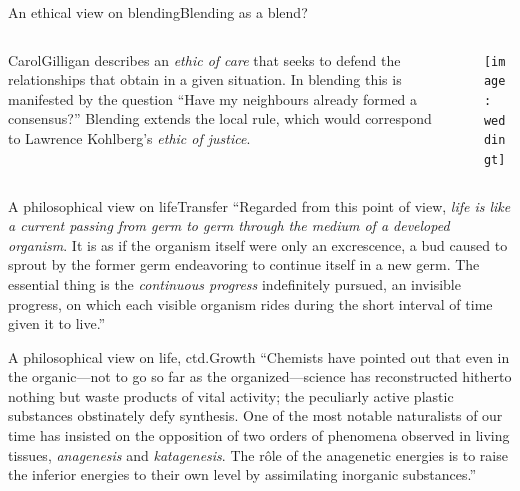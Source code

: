 \begin{frame}{An ethical view on blending}{Blending as a blend?}
\begin{columns}[onlytextwidth]
\begin{column}[T]{3in}
{Carol\bsp Gilligan} describes an
\emph{ethic of care} that seeks to defend the
relationships that obtain in a given situation.  In blending this is
manifested by the question ``Have my neighbours already formed a
consensus?''  Blending extends the local rule, which would correspond
to Lawrence Kohlberg's \emph{ethic of justice}.
\end{column}
\begin{column}[T]{.1in}
\end{column}
\begin{column}[T]{2in}
\vspace*{.2in}
\texttt{[image: weddingt]}
\end{column}
\end{columns}
\end{frame}

\begin{frame}{A philosophical view on life}{Transfer}
{\small ``Regarded from this point of view, \emph{life is like a current passing from germ to germ through the medium of a developed organism}. It is as if the organism itself were only an excrescence, a bud caused to sprout by the former germ endeavoring to continue itself in a new germ. The essential thing is the \emph{continuous progress} indefinitely pursued, an invisible progress, on which each visible organism rides during the short interval of time given it to live.''} \qquad\qquad {}
\end{frame}

\begin{frame}{A philosophical view on life, ctd.}{Growth}
``Chemists have pointed out that even in the organic---not to go so far as the organized---science has reconstructed hitherto nothing but waste products of vital activity; the peculiarly active plastic substances obstinately defy synthesis.  One of the most notable naturalists of our time has insisted on the opposition of two orders of phenomena observed in living tissues, \emph{anagenesis} and \emph{katagenesis}. The r\^{o}le of the anagenetic energies is to raise the inferior energies to their own level by assimilating inorganic substances.''\quad {}
\end{frame}

